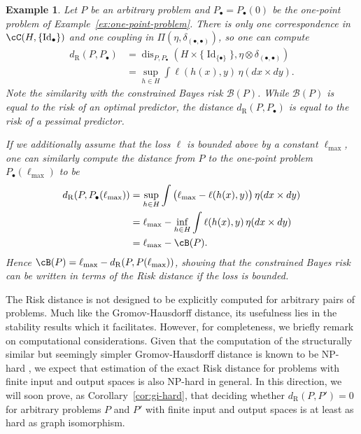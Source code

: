 \documentclass[twoside,11pt]{article}
\newtheorem{examples}[theorem]{Example}
\DeclareMathOperator{\id}{Id}
\newcommand{\dexp}[1][]{d_{\mathrm{R}#1}}
\DeclareMathOperator{\dis}{dis}
\begin{document}
\begin{examples}\label{ex:bayes-one-point}
    Let $P$ be an arbitrary problem and $P_\bullet = P_\bullet(0)$ be the one-point problem of Example~\ref{ex:one-point-problem}. There is only one correspondence in $\cC(H,\{\id_\bullet\})$ and one coupling in $\Pi(\eta,\delta_{(\bullet,\bullet)})$, so one can compute
    \begin{align*}
        \dexp(P,P_\bullet) & =
        \dis_{P,P_\bullet}\left(H \times \{\id_{\{\bullet\}}\}, \eta \otimes \delta_{(\bullet,\bullet)}\right)
        \\ & =
        \sup_{h\in H}\int \ell(h(x),y) \, \eta(dx\times dy).
    \end{align*}
    Note the similarity with the constrained Bayes risk $\mathcal B(P)$. While $\mathcal B(P)$ is equal to the risk of an \emph{optimal} predictor, the distance $\dexp(P,P_\bullet)$ is equal to the risk of a \emph{pessimal} predictor.

    If we additionally assume that the loss $\ell$ is bounded above by a constant $\ell_{\max}$, one can similarly compute the distance from $P$ to the one-point problem $P_\bullet(\ell_{\max})$ to be
    \begin{align*}
        \dexp(P,P_\bullet(\ell_{\max})) & =
        \sup_{h\in H}\int \big(\ell_{\max} - \ell(h(x),y) \big) \, \eta(dx\times dy)
        \\ & =
        \ell_{\max} - \inf_{h\in H}\int \ell(h(x),y) \, \eta(dx\times dy)
        \\ & = \ell_{\max} - \cB(P).
    \end{align*}
    Hence $\cB(P) = \ell_{\max} - \dexp(P,P(\ell_{\max}))$, showing that the constrained Bayes risk can be written in terms of the Risk distance if the loss is bounded.
\end{examples}


\begin{remark}
The Risk distance is not designed to be explicitly computed for arbitrary pairs of problems. Much like the Gromov-Hausdorff distance, its usefulness lies in the stability results which it facilitates. However, for completeness, we briefly remark on computational considerations. Given that the computation of the structurally similar but seemingly simpler Gromov-Hausdorff distance is known to be NP-hard \citep{agarwal_computing_2015,schmiedl_computational_2017,memoli_gromov-hausdorff_2021}, 
we expect that estimation of the exact Risk distance for problems with finite input and output spaces is also NP-hard in general.  In this direction, we will soon prove, as Corollary~\ref{cor:gi-hard}, that deciding whether $\dexp(P,P')=0$ for arbitrary problems $P$ and $P'$ with finite input and output spaces is at least as hard as graph isomorphism. 
\end{remark}
\end{document}
